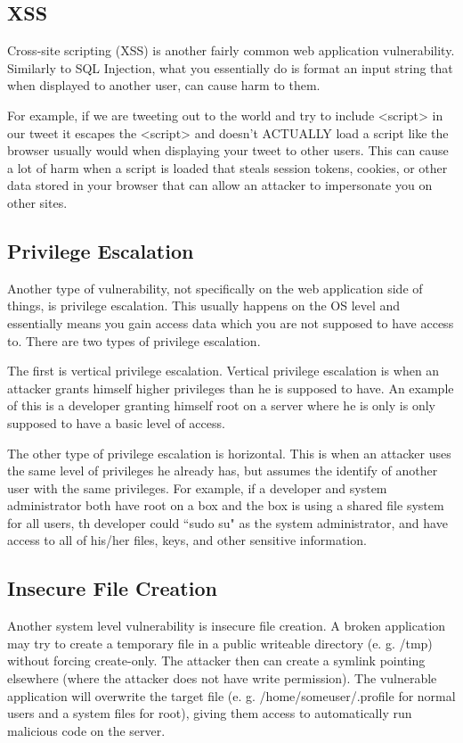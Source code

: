 \documentclass{report}
\begin{document}
\subsection*{XSS}

Cross-site scripting (XSS) is another fairly common web application
vulnerability. Similarly to SQL Injection, what you essentially do is format
an input string that when displayed to another user, can cause harm to them.

For example, if we are tweeting out to the world and try to include <script>
in our tweet it escapes the <script> and doesn't ACTUALLY load a script
like the browser usually would when displaying your tweet to other users. This
can cause a lot of harm when a script is loaded that steals session tokens,
cookies, or other data stored in your browser that can allow an attacker to
impersonate you on other sites. 

\subsection*{Privilege Escalation}

Another type of vulnerability, not specifically on the web application side of
things, is privilege escalation. This usually happens on the OS level and 
essentially means you gain access data which you are not supposed to have
access to. There are two types of privilege escalation.

The first is vertical privilege escalation. Vertical privilege escalation 
is when an attacker grants himself higher privileges than he is supposed to
have. An example of this is a developer granting himself root on a server 
where he is only is only supposed to have a basic level of access.

The other type of privilege escalation is horizontal. This is when an attacker
uses the same level of privileges he already has, but assumes the identify of
another user with the same privileges. For example, if a developer and system
administrator both have root on a box and the box is using a shared file
system for all users, th developer could ``sudo su" as the system administrator,
and have access to all of his/her files, keys, and other sensitive information.

\subsection*{Insecure File Creation}

Another system level vulnerability is insecure file creation. A broken 
application may try to create a temporary file in a public writeable directory
(e. g. /tmp) without forcing create-only. The attacker then can create a 
symlink pointing elsewhere (where the attacker does not have write
permission). The vulnerable application will overwrite the target
file (e. g. /home/someuser/.profile for normal users and a system files for 
root), giving them access to automatically run malicious code on the server.
\end{document}
